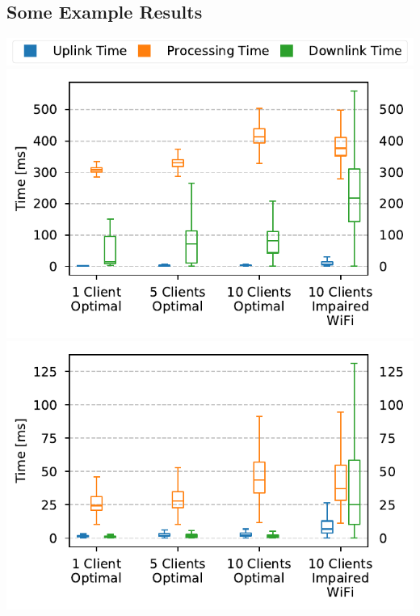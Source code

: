 \documentclass[portrait, a1]{KTHEEposter}
\begin{document}
\begin{pcolumns}[3]
\begin{pcolumn}[3]
\begin{pframe}[2.14]
                \section{Some Example Results}
                \begin{center}
                    \medskip
                    \includegraphics[width=\linewidth]{plots/comparison/box_legend.pdf}
                    \includegraphics[width=\linewidth]{plots/comparison/box_feedback.pdf}
                    \medskip
                    \includegraphics[width=\linewidth]{plots/comparison/box_nofeedback.pdf}
                    \medskip
                \end{center}
            

\end{pframe}
\end{pcolumn}
\end{pcolumns}
\end{document}
